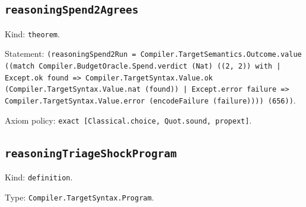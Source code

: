 \documentclass[11pt]{article}
\begin{document}
\subsection*{\texttt{reasoningSpend2Agrees}}
\noindent Kind: \texttt{theorem}.\par
\noindent Statement: \texttt{(reasoningSpend2Run = Compiler.TargetSemantics.Outcome.value ((match Compiler.BudgetOracle.Spend.verdict (Nat) ((2, 2)) with | Except.ok found => Compiler.TargetSyntax.Value.ok (Compiler.TargetSyntax.Value.nat (found)) | Except.error failure => Compiler.TargetSyntax.Value.error (encodeFailure (failure)))) (656))}.\par
\noindent Axiom policy: \texttt{exact [Classical.choice, Quot.sound, propext]}.\par
\subsection*{\texttt{reasoningTriageShockProgram}}
\noindent Kind: \texttt{definition}.\par
\noindent Type: \texttt{Compiler.TargetSyntax.Program}.\par
\end{document}
